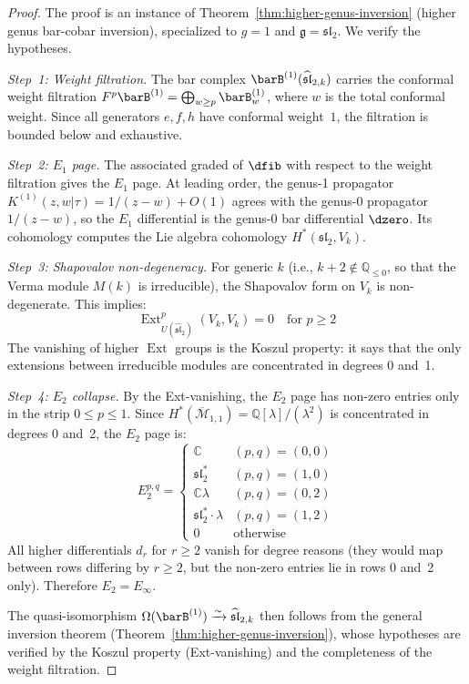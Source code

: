 \begin{proof}
The proof is an instance of Theorem~\ref{thm:higher-genus-inversion} (higher genus bar-cobar inversion), specialized to $g=1$ and $\mathfrak{g} = \mathfrak{sl}_2$.  We verify the hypotheses.

\emph{Step~1: Weight filtration.}
The bar complex $\barB^{(1)}(\widehat{\mathfrak{sl}}_{2,k})$ carries the conformal weight filtration $F^p\barB^{(1)} = \bigoplus_{w \geq p} \barB^{(1)}_w$, where $w$ is the total conformal weight.  Since all generators $e, f, h$ have conformal weight~$1$, the filtration is bounded below and exhaustive.

\emph{Step~2: $E_1$ page.}
The associated graded of $\dfib$ with respect to the weight filtration gives the $E_1$ page.  At leading order, the genus-1 propagator $K^{(1)}(z,w|\tau) = 1/(z-w) + O(1)$ agrees with the genus-0 propagator $1/(z-w)$, so the $E_1$ differential is the genus-0 bar differential $\dzero$.  Its cohomology computes the Lie algebra cohomology $H^*(\mathfrak{sl}_2, V_k)$.

\emph{Step~3: Shapovalov non-degeneracy.}
For generic $k$ (i.e., $k+2 \notin \mathbb{Q}_{\leq 0}$, so that the Verma module $M(k)$ is irreducible), the Shapovalov form on $V_k$ is non-degenerate.  This implies:
\begin{equation}
\operatorname{Ext}^p_{U(\widehat{\mathfrak{sl}}_2)}(V_k, V_k) = 0 \quad \text{for } p \geq 2
\end{equation}
The vanishing of higher $\operatorname{Ext}$ groups is the Koszul property: it says that the only extensions between irreducible modules are concentrated in degrees 0 and~1.

\emph{Step~4: $E_2$ collapse.}
By the Ext-vanishing, the $E_2$ page has non-zero entries only in the strip $0 \leq p \leq 1$.  Since $H^*(\overline{\mathcal{M}}_{1,1}) = \mathbb{Q}[\lambda]/(\lambda^2)$ is concentrated in degrees 0 and~2, the $E_2$ page is:
\begin{equation}
E_2^{p,q} = \begin{cases}
\mathbb{C} & (p,q) = (0,0) \\
\mathfrak{sl}_2^* & (p,q) = (1,0) \\
\mathbb{C}\lambda & (p,q) = (0,2) \\
\mathfrak{sl}_2^* \cdot \lambda & (p,q) = (1,2) \\
0 & \text{otherwise}
\end{cases}
\end{equation}
All higher differentials $d_r$ for $r \geq 2$ vanish for degree reasons (they would map between rows differing by $r \geq 2$, but the non-zero entries lie in rows 0 and~2 only).  Therefore $E_2 = E_\infty$.

The quasi-isomorphism $\Omega(\barB^{(1)}) \xrightarrow{\sim} \widehat{\mathfrak{sl}}_{2,k}$ then follows from the general inversion theorem (Theorem~\ref{thm:higher-genus-inversion}), whose hypotheses are verified by the Koszul property (Ext-vanishing) and the completeness of the weight filtration.
\end{proof}

